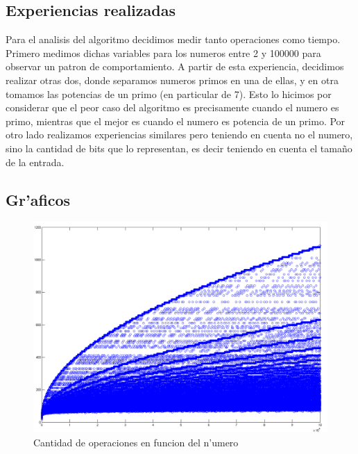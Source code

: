 \subsection{Experiencias realizadas}
Para el analisis del algoritmo decidimos medir tanto operaciones como tiempo. Primero medimos dichas variables para los numeros entre 2 y 100000 para observar un patron de comportamiento. A partir de esta experiencia, decidimos realizar otras dos, donde separamos numeros primos en una de ellas, y en otra tomamos las potencias de un primo (en particular de 7). Esto lo hicimos por considerar que el peor caso del algoritmo es precisamente cuando el numero es primo, mientras que el mejor es cuando el numero es potencia de un primo. Por otro lado realizamos experiencias similares pero teniendo en cuenta no el numero, sino la cantidad de bits que lo representan, es decir teniendo en cuenta el tama\~{n}o de la entrada.
\subsection{Gr'aficos}
\begin{figure}[H]
\centering
\includegraphics[scale=0.5]{../../codigo/ejercicio1/benchmark/graficos/todos_los_numeros/graficosTodos.png}
\caption{Cantidad de operaciones en funcion del n'umero}
\end{figure}

